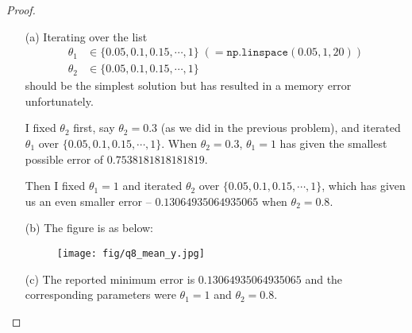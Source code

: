 \documentclass[12pt]{article}
\begin{document}
\begin{proof} $\;$ \vspace{-\topsep}
\begin{itemize}
    \item[(a)] Iterating over the list
    \begin{align*}
        \theta_1 & \in \{ 0.05, 0.1, 0.15, \cdots, 1\} \;(=\texttt{np.linspace}(0.05, 1, 20))\\
        \theta_2 & \in \{ 0.05, 0.1, 0.15, \cdots, 1\}
    \end{align*}
    should be the simplest solution but has resulted in a memory error unfortunately. 
    
    I fixed $\theta_2$ first, say $\theta_2 = 0.3$ (as we did in the previous problem), and iterated $\theta_1$ over $\{ 0.05, 0.1, 0.15, \cdots, 1\}$. When $\theta_2 = 0.3$, $\theta_1 = 1$ has given the smallest possible error of $0.7538181818181819$. 
    
    Then I fixed $\theta_1 = 1$ and iterated $\theta_2$ over $\{ 0.05, 0.1, 0.15, \cdots, 1\}$, which has given us an even smaller error -- $0.13064935064935065$ when $\theta_2 = 0.8$.
    
    \item[(b)] The figure is as below:
    \begin{figure}[!ht]
        \centering
        \texttt{[image: fig/q8\_mean\_y.jpg]}
    \end{figure}
    
    \item[(c)] The reported minimum error is $0.13064935064935065$ and the corresponding parameters were $\theta_1 = 1$ and $\theta_2 = 0.8$.
\end{itemize}
\end{proof}
\end{document}
